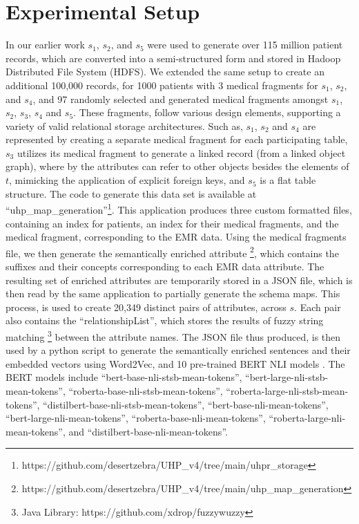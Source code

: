 \documentclass{ieeeaccess}
\begin{document}
\section{Experimental Setup}
\label{experimentalSetup}
In our earlier work \cite{Satti2020} $s_1$, $s_2$, and $s_5$ were used to generate over 115 million patient records, which are converted into a semi-structured form and stored in Hadoop Distributed File System (HDFS). We extended the same setup to create an additional 100,000 records, for 1000 patients with 3 medical fragments for $s_1$, $s_2$, and $s_4$, and 97 randomly selected and generated medical fragments amongst $s_1$, $s_2$, $s_3$, $s_4$ and $s_5$. These fragments, follow various design elements, supporting a variety of valid relational storage architectures. Such as, $s_1$, $s_2$ and $s_4$ are represented by creating a separate medical fragment for each participating table, $s_3$ utilizes its medical fragment to generate a linked record (from a linked object graph), where by the attributes can refer to other objects besides the elements of $t$, mimicking the application of explicit foreign keys, and $s_5$ is a flat table structure. The code to generate this data set is available at ``uhp\_map\_generation''\footnote{https://github.com/desertzebra/UHP\_v4/tree/main/uhpr\_storage}. This application produces three custom formatted files, containing an index for patients, an index for their medical fragments, and the medical fragment, corresponding to the EMR data. Using the medical fragments file, we then generate the semantically enriched attribute \footnote{https://github.com/desertzebra/UHP\_v4/tree/main/uhp\_map\_generation}, which contains the suffixes and their concepts corresponding to each EMR data attribute. The resulting set of enriched attributes are temporarily stored in a JSON file, which is then read by the same application to partially generate the schema maps. This process, is used to create 20,349 distinct pairs of attributes, across $s$. Each pair also contains the ``relationshipList'', which stores the results of fuzzy string matching\cite{FuzzyWuzzy} \footnote{Java Library: https://github.com/xdrop/fuzzywuzzy} between the attribute names. 
The JSON file thus produced, is then used by a python script to generate the semantically enriched sentences and their embedded vectors using Word2Vec, and 10 pre-trained BERT NLI models \cite{reimers-2019-sentence-bert}. The BERT models include ``bert-base-nli-stsb-mean-tokens'', ``bert-large-nli-stsb-mean-tokens'', ``roberta-base-nli-stsb-mean-tokens'', ``roberta-large-nli-stsb-mean-tokens'', ``distilbert-base-nli-stsb-mean-tokens'', ``bert-base-nli-mean-tokens'', ``bert-large-nli-mean-tokens'', ``roberta-base-nli-mean-tokens'', ``roberta-large-nli-mean-tokens'', and ``distilbert-base-nli-mean-tokens''. 
\end{document}
